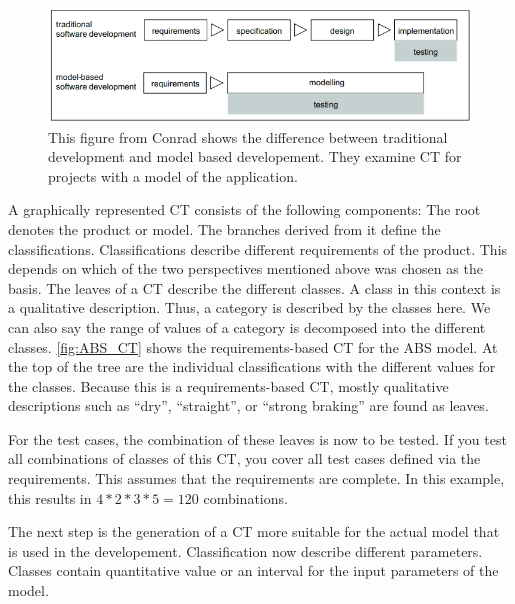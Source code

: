\begin{figure}[H]
\centering
\includegraphics[scale=0.75]{../../individual/groeger/images/TraditionalVSModel.png} 
\caption{This figure from Conrad\cite{Conrad2005} shows the difference between traditional development and model based developement. They examine CT for projects with a model of the application. \cite{Conrad2005}}
\label{fig:tradditional_vs_modelbased}
\end{figure}

A graphically represented CT consists of the following components: The root denotes the product or model. The branches derived from it define the classifications. Classifications describe different requirements of the product. This depends on which of the two perspectives mentioned above was chosen as the basis. The leaves of a CT describe the different classes. A class in this context is a qualitative description. Thus, a category is described by the classes here. We can also say the range of values of a category is decomposed into the different classes. \autoref{fig:ABS_CT} shows the requirements-based CT for the ABS model. At the top of the tree are the individual classifications with the different values for the classes. Because this is a requirements-based CT, mostly qualitative descriptions such as \enquote{dry}, \enquote{straight}, or \enquote{strong braking} are found as leaves.  

For the test cases, the combination of these leaves is now to be tested. If you test all combinations of classes of this CT, you cover all test cases defined via the requirements. This assumes that the requirements are complete. In this example, this results in $4*2*3*5 = 120$ combinations.

The next step is the generation of a CT more suitable for the actual model that is used in the developement. Classification now describe different parameters. Classes contain quantitative value or an interval for the input parameters of the model. 

